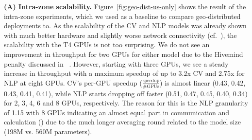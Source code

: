 \textbf{(A) Intra-zone scalability.}
Figure~\ref{fig:geo-dist-us-only} shows the result of the intra-zone experiments, which we used as a baseline to compare geo-distributed deployments to.
As the scalability of the CV and NLP models was already shown with much better hardware and slightly worse network connectivity (cf.~), the scalability with the T4 GPUs is not too surprising.
We do not see an improvement in throughput for two GPUs for either model due to the Hivemind penalty discussed in ~.
However, starting with three GPUs, we see a steady increase in throughput with a maximum speedup of up to 3.2x CV and 2.75x for NLP at eight GPUs. 
CV's per-GPU speedup ($\frac{\text{speedup}}{\#\text{GPUs}}$) is almost linear (0.43, 0.42, 0.43, 0.41, 0.41), while NLP starts dropping off faster (0.51, 0.47, 0.45, 0.40, 0.34) for 2, 3, 4, 6 and 8 GPUs, respectively.
The reason for this is the NLP granularity of 1.15 with 8 GPUs indicating an almost equal part in communication and calculation () due to the much longer averaging round related to the model size (198M vs. 560M parameters).

